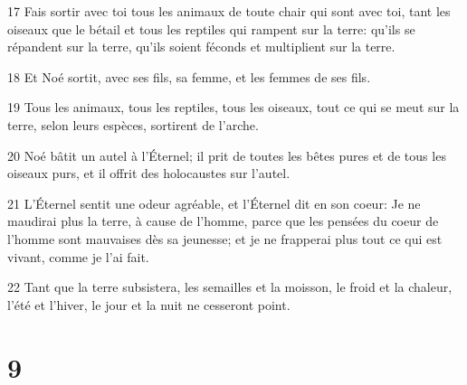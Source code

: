 \par 17 Fais sortir avec toi tous les animaux de toute chair qui sont avec toi, tant les oiseaux que le bétail et tous les reptiles qui rampent sur la terre: qu'ils se répandent sur la terre, qu'ils soient féconds et multiplient sur la terre.
\par 18 Et Noé sortit, avec ses fils, sa femme, et les femmes de ses fils.
\par 19 Tous les animaux, tous les reptiles, tous les oiseaux, tout ce qui se meut sur la terre, selon leurs espèces, sortirent de l'arche.
\par 20 Noé bâtit un autel à l'Éternel; il prit de toutes les bêtes pures et de tous les oiseaux purs, et il offrit des holocaustes sur l'autel.
\par 21 L'Éternel sentit une odeur agréable, et l'Éternel dit en son coeur: Je ne maudirai plus la terre, à cause de l'homme, parce que les pensées du coeur de l'homme sont mauvaises dès sa jeunesse; et je ne frapperai plus tout ce qui est vivant, comme je l'ai fait.
\par 22 Tant que la terre subsistera, les semailles et la moisson, le froid et la chaleur, l'été et l'hiver, le jour et la nuit ne cesseront point.

\chapter{9}

